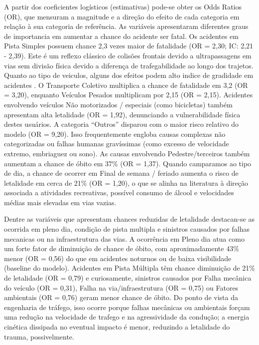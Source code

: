 \documentclass[
  brazilian,
  12pt,
]{article}
\begin{document}
A partir dos coeficientes logísticos (estimativas) pode-se obter os Odds
Ratios (OR), que mensuram a magnitude e a direção do efeito de cada
categoria em relação à sua categoria de referência. As variáveis
apresentaram diferentes graus de importancia em aumentar a chance do
acidente ser fatal. Os acidentes em Pista Simples possuem chance 2,3
vezes maior de fatalidade (OR = 2,30; IC: 2,21 - 2,39). Este é um
reflexo clássico de colisões frontais devido a ultrapassagens em vias
sem divisão física devido a diferença de trafegabilidade ao longo dos
trajetos. Quanto ao tipo de veiculos, alguns dos efeitos podem alto
indice de gradidade em acidentes . O Transporte Coletivo multiplica a
chance de fatalidade em 3,2 (OR = 3,20), enquanto Veículos Pesados
multiplicam por 2,15 (OR = 2,15). Acidentes envolvendo veículos Não
motorizados / especiais (como bicicletas) também apresentam alta
letalidade (OR = 1,92), denunciando a vulnerabilidade física destes
usuários. A categoria ``Outros'' disparou com o maior risco relativo do
modelo (OR = 9,20). Isso frequentemente engloba causas complexas não
categorizadas ou falhas humanas gravíssimas (como excesso de velocidade
extremo, embriaguez ou sono). As causas envolvendo Pedestre/terceiros
também aumentam a chance de óbito em 37\% (OR = 1,37). Quando camparamos
ao tipo de dia, a chance de ocorrer em Final de semana / feriado aumenta
o risco de letalidade em cerca de 21\% (OR = 1,20), o que se alinha na
literatura à direção associada a atividades recreativas, possível
consumo de álcool e velocidades médias mais elevadas em vias vazias.

Dentre as variáveis que apresentam chances reduzidas de letalidade
destacan-se as ocorrida em pleno dia, condição de pista multipla e
sinistros causados por falhas mecanicas ou na infraestrutura das vias. A
ocorrência em Pleno dia atua como um forte fator de diminuição de chance
de óbito, com aproximadamente 43\% menor (OR = 0,56) do que em acidentes
noturnos ou de baixa visibilidade (baseline do modelo). Acidentes em
Pista Múltipla têm chance diminuição de 21\% de letalidade (OR = 0,79) e
curiosamente, sinistros causados por Falha mecânica do veículo (OR =
0,31), Falha na via/infraestrutura (OR = 0,75) ou Fatores ambientais (OR
= 0,76) geram menor chance de óbito. Do ponto de vista da engenharia de
tráfego, isso ocorre porque falhas mecânicas ou ambientais forçam uma
redução na velocidade de trafego e na agressividade da condução; a
energia cinética dissipada no eventual impacto é menor, reduzindo a
letalidade do trauma, possivelmente.
\end{document}
